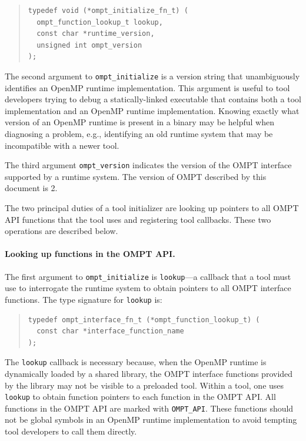 \documentclass{article}
\begin{document}
\begin{quote}
\begin{verbatim}
typedef void (*ompt_initialize_fn_t) (
  ompt_function_lookup_t lookup,
  const char *runtime_version, 
  unsigned int ompt_version
);
\end{verbatim}
\end{quote}
The second argument to  \verb|ompt_initialize| is a version string that unambiguously identifies an OpenMP runtime implementation. This argument is useful to tool developers trying to debug a statically-linked executable that contains both a tool implementation and an OpenMP runtime implementation. Knowing exactly what version of an OpenMP runtime is present in a binary may be helpful when diagnosing a problem, e.g., identifying an old runtime system that may be incompatible with a newer tool.

The third argument \verb|ompt_version| indicates the version of the OMPT interface supported by a runtime system.
The version of OMPT described by this document is 2.

The two principal duties of a tool initializer are looking up pointers to all OMPT API functions that the tool uses and registering tool callbacks.  These two operations are described below.

\paragraph{Looking up functions in the OMPT API.} The first argument to \verb|ompt_initialize| is \verb|lookup|---a callback that a tool must use to interrogate the runtime system to obtain pointers to all OMPT interface functions.
The type signature for  \verb|lookup| is:

\begin{quote}
\begin{verbatim}
typedef ompt_interface_fn_t (*ompt_function_lookup_t) (
  const char *interface_function_name
);
\end{verbatim}
\end{quote}

\noindent
The \verb|lookup| callback is necessary because, when the OpenMP runtime is dynamically loaded by a shared library, the OMPT interface functions provided by the library may not be visible to a preloaded tool. Within a tool, one uses \verb|lookup| to obtain function pointers to each function in the OMPT API.  All functions in the OMPT API are marked with \verb|OMPT_API|. These functions should not be global symbols in an OpenMP runtime implementation to avoid tempting tool developers to call them directly. 
\end{document}
